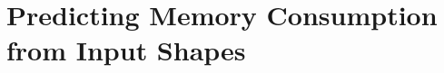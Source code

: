 \chapter{Predicting Memory Consumption from Input Shapes}
\label{ch:predicting-memory-consumption-from-input-shapes}





